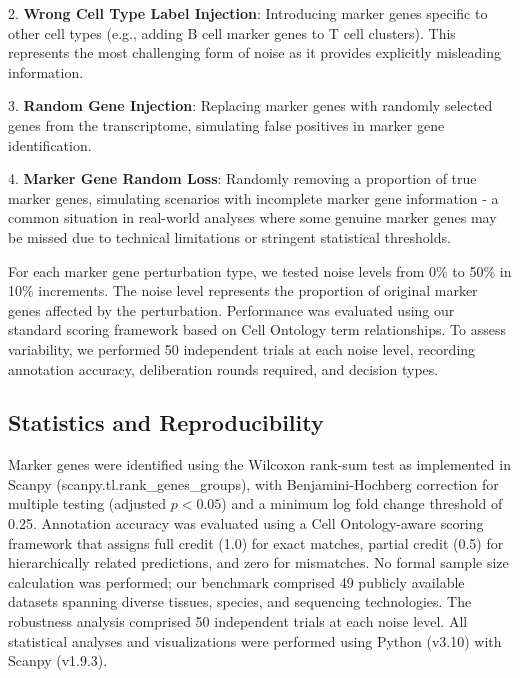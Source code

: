 \documentclass[pdflatex,sn-nature]{sn-jnl}%
\theoremstyle{thmstyleone}%
\theoremstyle{thmstyletwo}%
\theoremstyle{thmstylethree}%
\begin{document}
2. \textbf{Wrong Cell Type Label Injection}: Introducing marker genes specific to other cell types (e.g., adding B cell marker genes to T cell clusters). This represents the most challenging form of noise as it provides explicitly misleading information.

3. \textbf{Random Gene Injection}: Replacing marker genes with randomly selected genes from the transcriptome, simulating false positives in marker gene identification.

4. \textbf{Marker Gene Random Loss}: Randomly removing a proportion of true marker genes, simulating scenarios with incomplete marker gene information - a common situation in real-world analyses where some genuine marker genes may be missed due to technical limitations or stringent statistical thresholds.

For each marker gene perturbation type, we tested noise levels from 0\% to 50\% in 10\% increments. The noise level represents the proportion of original marker genes affected by the perturbation. Performance was evaluated using our standard scoring framework based on Cell Ontology term relationships. To assess variability, we performed 50 independent trials at each noise level, recording annotation accuracy, deliberation rounds required, and decision types.

\subsection{Statistics and Reproducibility}

Marker genes were identified using the Wilcoxon rank-sum test as implemented in Scanpy (scanpy.tl.rank\_genes\_groups), with Benjamini-Hochberg correction for multiple testing (adjusted $p < 0.05$) and a minimum log fold change threshold of 0.25. Annotation accuracy was evaluated using a Cell Ontology-aware scoring framework that assigns full credit (1.0) for exact matches, partial credit (0.5) for hierarchically related predictions, and zero for mismatches. No formal sample size calculation was performed; our benchmark comprised 49 publicly available datasets spanning diverse tissues, species, and sequencing technologies. The robustness analysis comprised 50 independent trials at each noise level. All statistical analyses and visualizations were performed using Python (v3.10) with Scanpy (v1.9.3).
\end{document}
